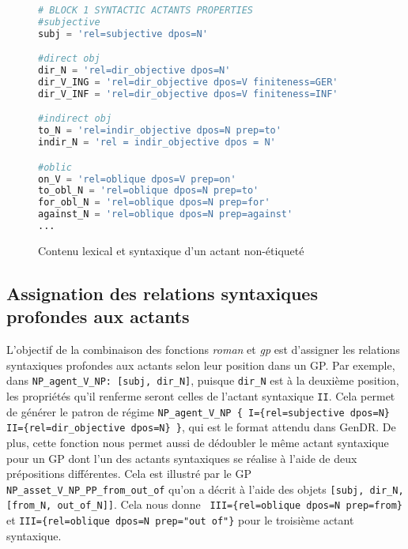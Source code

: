 \begin{figure}[htb]
  \caption{Contenu lexical et syntaxique d'un actant non-étiqueté}
	\label{}
\begin{lstlisting}[language=Python]
# BLOCK 1 SYNTACTIC ACTANTS PROPERTIES
#subjective
subj = 'rel=subjective dpos=N'

#direct obj
dir_N = 'rel=dir_objective dpos=N'
dir_V_ING = 'rel=dir_objective dpos=V finiteness=GER'
dir_V_INF = 'rel=dir_objective dpos=V finiteness=INF'

#indirect obj
to_N = 'rel=indir_objective dpos=N prep=to'
indir_N = 'rel = indir_objective dpos = N'

#oblic
on_V = 'rel=oblique dpos=V prep=on'
to_obl_N = 'rel=oblique dpos=N prep=to' 
for_obl_N = 'rel=oblique dpos=N prep=for'
against_N = 'rel=oblique dpos=N prep=against'
...
\end{lstlisting}
\end{figure}

\subsection{Assignation des relations syntaxiques profondes aux actants}

L'objectif de la combinaison des fonctions \emph{roman} et \emph{gp} est d'assigner les relations syntaxiques profondes aux actants selon leur position dans un \ac{GP}. Par exemple, dans \lstinline|NP_agent_V_NP: [subj, dir_N]|, puisque \texttt{dir\_N} est à la deuxième position, les propriétés qu'il renferme seront celles de l'actant syntaxique \texttt{II}. Cela permet de générer le patron de régime \lstinline|NP_agent_V_NP { I={rel=subjective dpos=N} II={rel=dir_objective dpos=N} }|, qui est le format attendu dans GenDR. De plus, cette fonction nous permet aussi de dédoubler le même actant syntaxique pour un \ac{GP} dont l'un des actants syntaxiques se réalise à l'aide de deux prépositions différentes. Cela est illustré par le \ac{GP} \lstinline|NP_asset_V_NP_PP_from_out_of| qu'on a décrit à l'aide des objets \lstinline|[subj, dir_N, [from_N, out_of_N]]|. Cela nous donne \lstinline| III={rel=oblique dpos=N prep=from}| et \lstinline|III={rel=oblique dpos=N prep="out of"}| pour le troisième actant syntaxique.

